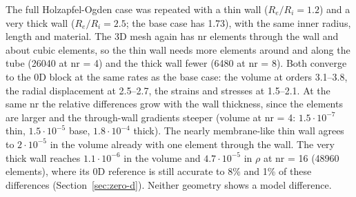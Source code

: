 The full Holzapfel-Ogden case was repeated with a thin wall ($R_e/R_i = 1.2$) and a very
thick wall ($R_e/R_i = 2.5$; the base case has 1.73), with the same inner radius, length
and material. The 3D mesh again has nr elements through the wall and about cubic elements,
so the thin wall needs more elements around and along the tube (26040 at nr = 4) and the
thick wall fewer (6480 at nr = 8). Both converge to the 0D block at the same rates as the
base case: the volume at orders 3.1--3.8, the radial displacement at 2.5--2.7, the
strains and stresses at 1.5--2.1. At the same nr the relative differences grow with the
wall thickness, since the elements are larger and the through-wall gradients steeper
(volume at nr = 4: $1.5\cdot10^{-7}$ thin, $1.5\cdot10^{-5}$ base, $1.8\cdot10^{-4}$ thick).
The nearly membrane-like thin wall agrees to $2\cdot10^{-5}$ in the volume already with one
element through the wall. The very thick wall reaches $1.1\cdot10^{-6}$ in the volume and
$4.7\cdot10^{-5}$ in $\rho$ at nr = 16 (48960 elements), where its 0D reference is still
accurate to 8\% and 1\% of these differences (Section~\ref{sec:zero-d}). Neither geometry
shows a model difference.
